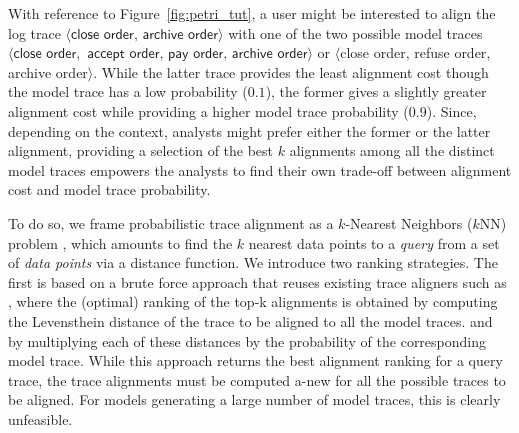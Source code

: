 With reference to Figure~\ref{fig:petri_tut}, a user might be interested to align the log trace $\langle \textsf{close order},\,\textsf{archive order}\rangle$ with one of the two possible model traces $\langle\textsf{close order},$ $\textsf{accept order},\,\textsf{pay order},\,\textsf{archive order}\rangle$ or $\langle$\textsf{close order}, \textsf{refuse order}, \textsf{archive order}$\rangle$. While the latter trace provides the least alignment cost though the model trace has a low probability ($0.1$), the former gives a slightly greater alignment cost while providing a higher model trace probability ($0.9$). Since, depending on the context, analysts might prefer either the former or the latter alignment, providing a selection of the best $k$ alignments among all the distinct model traces empowers the analysts to find their own trade-off between alignment cost and model trace probability.



To do so, we frame probabilistic trace alignment as a $k$-Nearest Neighbors ($k$NN) problem \cite{Altman}, which amounts to find the $k$ nearest data points to a \textit{query} from a set of \textit{data points} via a distance function.
We introduce two ranking strategies. The first is based on a brute force approach that reuses existing trace aligners such as \cite{DBLP:conf/edoc/AdriansyahDA11,LeoniM17}, where the (optimal) ranking of the top-k alignments is obtained by computing the Levensthein distance of the trace to be aligned to all the model traces. and by multiplying each of these distances by the probability of the corresponding model trace. While this approach returns the best alignment ranking for a query trace, the trace alignments must be computed a-new for all the possible traces to be aligned. For models generating a large number of model traces, this is clearly unfeasible. 

